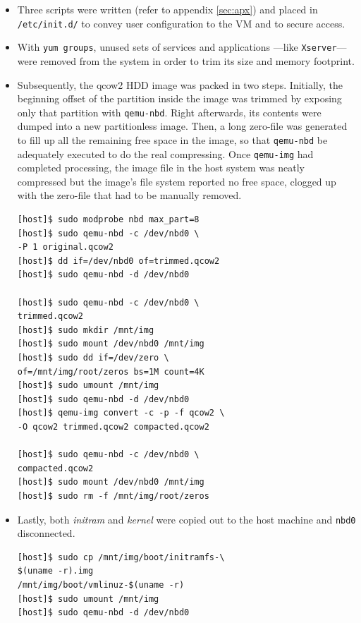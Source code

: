 \documentclass{sig-alternate}
\begin{document}
\begin{itemize}
 \item Three scripts were written (refer to appendix \ref{sec:apx}) and placed in \texttt{/etc/init.d/} to convey user configuration to the VM and to secure access.
 
 \item With \texttt{yum groups}, unused sets of services and applications ---like \texttt{Xserver}--- were removed from the system in order to trim its size and memory footprint.
 
 \item Subsequently, the qcow2 HDD image was packed in two steps. Initially, the beginning offset of the partition inside the image was trimmed by exposing only that partition with \texttt{qemu-nbd}. Right afterwards, its contents were dumped into a new partitionless image. Then, a long zero-file was generated to fill up all the remaining free space in the image, so that \texttt{qemu-nbd} be adequately executed to do the real compressing. Once \texttt{qemu-img} had completed processing, the image file in the host system was neatly compressed but the image's file system reported no free space, clogged up with the zero-file that had to be manually removed.
 
   \begin{verbatim}
[host]$ sudo modprobe nbd max_part=8
[host]$ sudo qemu-nbd -c /dev/nbd0 \
-P 1 original.qcow2
[host]$ dd if=/dev/nbd0 of=trimmed.qcow2
[host]$ sudo qemu-nbd -d /dev/nbd0

[host]$ sudo qemu-nbd -c /dev/nbd0 \
trimmed.qcow2
[host]$ sudo mkdir /mnt/img
[host]$ sudo mount /dev/nbd0 /mnt/img
[host]$ sudo dd if=/dev/zero \
of=/mnt/img/root/zeros bs=1M count=4K
[host]$ sudo umount /mnt/img
[host]$ sudo qemu-nbd -d /dev/nbd0
[host]$ qemu-img convert -c -p -f qcow2 \
-O qcow2 trimmed.qcow2 compacted.qcow2

[host]$ sudo qemu-nbd -c /dev/nbd0 \
compacted.qcow2
[host]$ sudo mount /dev/nbd0 /mnt/img
[host]$ sudo rm -f /mnt/img/root/zeros
   \end{verbatim}
   
 \item Lastly, both \emph{initram} and \emph{kernel} were copied out to the host machine and \texttt{nbd0} disconnected.
 
 \begin{verbatim}
[host]$ sudo cp /mnt/img/boot/initramfs-\
$(uname -r).img
/mnt/img/boot/vmlinuz-$(uname -r)
[host]$ sudo umount /mnt/img
[host]$ sudo qemu-nbd -d /dev/nbd0
 \end{verbatim}

\end{itemize}
\end{document}

